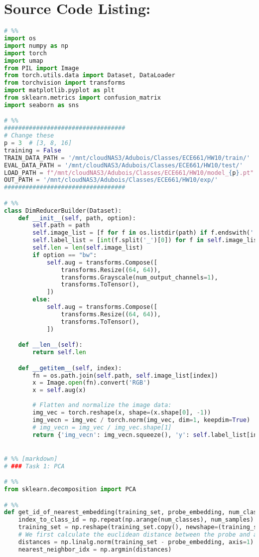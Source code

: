 \documentclass{article}
\begin{document}
\section{Source Code Listing:}
\begin{lstlisting}[language=Python]
# %%
import os
import numpy as np
import torch
import umap
from PIL import Image
from torch.utils.data import Dataset, DataLoader
from torchvision import transforms
import matplotlib.pyplot as plt
from sklearn.metrics import confusion_matrix
import seaborn as sns

# %%
##################################
# Change these
p = 3  # [3, 8, 16]
training = False
TRAIN_DATA_PATH = '/mnt/cloudNAS3/Adubois/Classes/ECE661/HW10/train/'
EVAL_DATA_PATH = '/mnt/cloudNAS3/Adubois/Classes/ECE661/HW10/test/'
LOAD_PATH = f"/mnt/cloudNAS3/Adubois/Classes/ECE661/HW10/model_{p}.pt"
OUT_PATH = '/mnt/cloudNAS3/Adubois/Classes/ECE661/HW10/exp/'
##################################

# %%
class DimReducerBuilder(Dataset):
    def __init__(self, path, option):
        self.path = path
        self.image_list = [f for f in os.listdir(path) if f.endswith('.png')]
        self.label_list = [int(f.split('_')[0]) for f in self.image_list]
        self.len = len(self.image_list)
        if option == "bw":
            self.aug = transforms.Compose([
                transforms.Resize((64, 64)),
                transforms.Grayscale(num_output_channels=1),
                transforms.ToTensor(),
            ])
        else:
            self.aug = transforms.Compose([
                transforms.Resize((64, 64)),
                transforms.ToTensor(),
            ])

    def __len__(self):
        return self.len

    def __getitem__(self, index):
        fn = os.path.join(self.path, self.image_list[index])
        x = Image.open(fn).convert('RGB')
        x = self.aug(x)
        
        # Flatten and normalize the image data:
        img_vec = torch.reshape(x, shape=(x.shape[0], -1))
        img_vecn = img_vec / torch.norm(img_vec, dim=1, keepdim=True)
        # img_vecn = img_vec / img_vec.shape[1]
        return {'img_vecn': img_vecn.squeeze(), 'y': self.label_list[index]}


# %% [markdown]
# ### Task 1: PCA

# %%
from sklearn.decomposition import PCA

# %%
def get_id_of_nearest_embedding(training_set, probe_embedding, num_classes=30, num_samples=21):
    index_to_class_id = np.repeat(np.arange(num_classes), num_samples)
    training_set = np.reshape(training_set.copy(), newshape=(training_set.shape[0]*training_set.shape[1], -1))
    # We first calculate the euclidean distance between the probe and all trained embeddings:
    distances = np.linalg.norm(training_set - probe_embedding, axis=1)
    nearest_neighbor_idx = np.argmin(distances)
    

\end{lstlisting}
\end{document}
